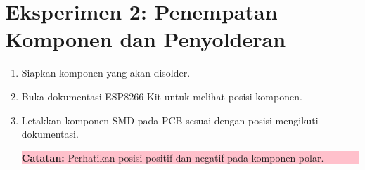 \section{Eksperimen 2: Penempatan Komponen dan Penyolderan}
\begin{enumerate}
    \item Siapkan komponen yang akan disolder.
    \item Buka dokumentasi ESP8266 Kit untuk melihat posisi komponen.
    \item Letakkan komponen SMD pada PCB sesuai dengan posisi mengikuti dokumentasi.
    \begin{center}
        \colorbox{pink}{\parbox{0.8\linewidth}{\textbf{Catatan:} Perhatikan posisi positif dan negatif pada komponen polar.}}
    \end{center}
    

\end{enumerate}
